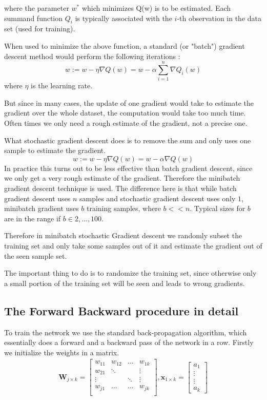 where the parameter $w^*$ which minimizes Q(w) is to be estimated. Each summand function $Q_i$ is typically associated with the $i$-th observation in the data set (used for training).

When used to minimize the above function, a standard (or "batch") gradient descent method would perform the following iterations :
\begin{equation}
w := w - \eta \nabla Q(w) = w - \alpha \sum_{i=1}^n \nabla Q_i(w)
\end{equation}
where $\eta$ is the learning rate.

But since in many cases, the update of one gradient would take to estimate the gradient over the whole dataset, the computation would take too much time. Often times we only need a rough estimate of the gradient, not a precise one.

What stochastic gradient descent does is to remove the sum and only uses one sample to estimate the gradient. 
\begin{equation}
w := w - \eta \nabla Q(w) = w - \alpha \nabla Q(w)
\end{equation}
In practice this turns out to be less effective than batch gradient descent, since we only get a very rough estimate of the gradient.
Therefore the minibatch gradient descent technique is used. The difference here is that while batch gradient descent uses $n$ samples and stochastic gradient descent uses only $1$, minibatch gradient uses $b$ training samples, where $b << n$. Typical sizes for $b$ are in the range if $b \in {2,\ldots,100}$.

Therefore in minibatch stochastic Gradient descent we randomly subset the training set and only take some samples out of it and estimate the gradient out of the seen sample set.

The important thing to do is to randomize the training set, since otherwise only a small portion of the training set will be seen and leads to wrong gradients.

\subsection{The Forward Backward procedure in detail}

To train the network we use the standard back-propagation algorithm, which essentially does a forward and a backward pass of the network in a row.
Firstly we initialize the weights in a matrix. 
\begin{align}
\mathbf{W}_{j \times k } = \begin{bmatrix}
w_{11} & w_{12} & \ldots & w_{1k}\\
w_{21} & \ddots & & \vdots\\
\vdots & & \ddots  & \vdots\\
w_{j1} & \ldots & \ldots  & w_{jk}\\
\end{bmatrix},
\mathbf{x}_{1 \times k} = \begin{bmatrix}
a_{1} \\
\vdots\\
\vdots \\
a_{k}
\end{bmatrix}
\end{align}


